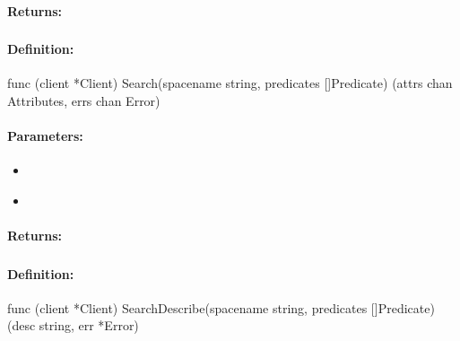 \paragraph{Returns:}


\pagebreak
\subsubsection{}
\label{api:Go:Search}


\paragraph{Definition:}
\begin{gocode}
func (client *Client) Search(spacename string, predicates []Predicate) (attrs chan Attributes, errs chan Error)
\end{gocode}

\paragraph{Parameters:}
\begin{itemize}[noitemsep]
\item {}\\

\item {}\\

\end{itemize}

\paragraph{Returns:}


\pagebreak
\subsubsection{}
\label{api:Go:SearchDescribe}


\paragraph{Definition:}
\begin{gocode}
func (client *Client) SearchDescribe(spacename string, predicates []Predicate) (desc string, err *Error)
\end{gocode}

